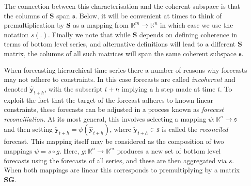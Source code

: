 \documentclass[12pt]{article}
\theoremstyle{definition}
\begin{document}
The connection between this characterisation and the coherent subspace is that the columns of $\bm{S}$ span $\mathfrak{s}$.  Below, it will be convenient at times to think of premultiplication by $\bm{S}$ as a mapping from $\mathbb{R}^m\rightarrow\mathbb{R}^n$ in which case we use the notation $s(.)$.  Finally we note that while $\bm{S}$ depends on defining coherence in terms of bottom level series, and alternative definitions will lead to a different $\bm{S}$ matrix, the columns of all such matrices will span the same coherent subspace $\mathfrak{s}$.



When forecasting hierarchical time series there a number of reasons why forecasts may not adhere to constraints. 
In this case forecasts are called {\em incoherent} and denoted $\hat{\bm y}_{t+h}$, with the subscript $t+h$ implying a h step made at time $t$.  To exploit the fact that the target of the forecast adheres to known linear constraints, these forecasts can be adjusted in a process known as {\em forecast reconciliation}.  At its most general, this involves selecting a mapping $\psi:\mathbb{R}^n\rightarrow\mathfrak{s}$ and then setting $\tilde{\bm y}_{t+h}=\psi(\hat{\bm y}_{t+h})$, where $\tilde{\bm y}_{t+h}\in\mathfrak{s}$ is called the {\em reconciled} forecast.  This mapping itself may be considered as the composition of two mappings $\psi=s\circ g$. Here, $g:\mathbb{R}^{n}\rightarrow\mathbb{R}^{m}$ produces a new set of bottom level forecasts using the forecasts of all series, and these are then aggregated via $s$.  When both mappings are linear this corresponds to premultiplying by a matrix $\bm{S}\bm{G}$.  
\end{document}
